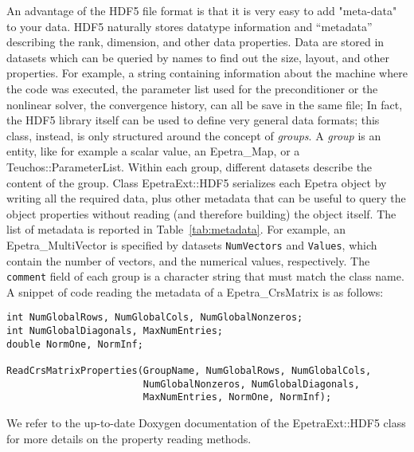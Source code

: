 \documentclass[11pt,relax]{SANDreport}
\begin{document}
An advantage of the HDF5 file format is that 
it is very easy to add "meta-data" to your data.
HDF5 naturally stores
datatype information and ``metadata'' describing the rank, dimension, and
other data properties. Data are stored in datasets which can be queried by
names to find out the size, layout, and other properties.
For example, a string
containing information about the machine where the code was executed, the
parameter list used for the preconditioner or the nonlinear solver, the
convergence history, can all be save in the same file;
In fact, the HDF5 library itself can be used to define very general data
formats; this class, instead, is only structured around the concept of {\sl
  groups}. 
A {\sl group}
is an entity, like for example a scalar value, an Epetra\_Map, or a
Teuchos::ParameterList. Within each group, different datasets describe the
content of the group. Class EpetraExt::HDF5 serializes each Epetra object by
writing all the required data, plus other metadata that can be useful to query
the object properties without reading (and therefore building) the object
itself. The list of metadata is reported in Table~\ref{tab:metadata}.
For example, an Epetra\_MultiVector is specified by
datasets {\tt NumVectors} and {\tt Values}, which contain the number of vectors, and
the numerical values, respectively. The {\tt comment} field of each group is a
character string that must match the class name. A snippet of code reading the
metadata of a Epetra\_CrsMatrix is as follows:
\begin{verbatim}
int NumGlobalRows, NumGlobalCols, NumGlobalNonzeros;
int NumGlobalDiagonals, MaxNumEntries;
double NormOne, NormInf;

ReadCrsMatrixProperties(GroupName, NumGlobalRows, NumGlobalCols,
                        NumGlobalNonzeros, NumGlobalDiagonals, 
                        MaxNumEntries, NormOne, NormInf);
\end{verbatim}
We refer to the up-to-date Doxygen documentation of the EpetraExt::HDF5 class
for more details on the property reading methods.
\end{document}

